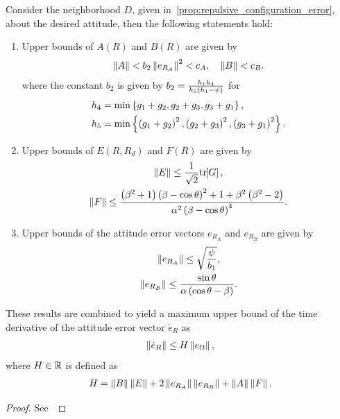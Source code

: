 \begin{prop}\label{prop:eR_dot_bound}
Consider the neighborhood \( D \), given in~\cref{prop:repulsive_configuration_error}, about the desired attitude, then the following statements hold:
\begin{enumerate}
    \item \label{item:prop_eR_dot_bound_AB} Upper bounds of \( A(R) \) and \( B(R) \) are given by
        \begin{gather}
            \left\| A \right\| < b_2 \left\| e_{R_A} \right\|^2 < c_A  , \quad \left\| B \right\| < c_B. \label{eqn:AB_bound}
        \end{gather}
        where the constant \( b_2\) is given by \( b_2 = \frac{h_1 h_4}{h_5 \left( h_1 - \psi \right)}\) for
        \begin{align*}
            h_4 &= \min\left\{ g_1 + g_2, g_2 + g_3 , g_3 + g_1 \right\} ,\\
            h_5 &= \min\left\{ \left( g_1 + g_2 \right)^2,\left( g_2 + g_3 \right)^2 , \left( g_3 + g_1 \right)^2 \right\}.
        \end{align*}
    \item \label{item:prop_eR_dot_bound_EF} Upper bounds of \( E(R,R_d) \) and \( F(R) \) are given by
        \begin{gather}
            \left\| E \right\| \leq \frac{1}{\sqrt{2}} \mathrm{tr}\negthickspace\left[ G \right]  , \label{eqn:E_bound} \\
            \left\| F \right\| \leq \frac{\left( \beta^2 + 1 \right)\left( \beta - \cos \theta \right)^2 + 1 + \beta^2 \left( \beta^2-2 \right)}{\alpha^2 \left( \beta-\cos \theta \right)^4}. \label{eqn:F_bound}
        \end{gather}
    \item Upper bounds of the attitude error vectors \( e_{R_A} \) and \( e_{R_B} \) are given by
        \begin{gather}
            \left\| e_{R_A} \right\| \leq \sqrt{\frac{\psi}{b_1}}, \label{eqn:eRA_bound} \\
            \left\| e_{R_B} \right\| \leq \frac{\sin\theta}{\alpha \left( \cos \theta - \beta \right)}. \label{eqn:eRB_bound}
        \end{gather}
\end{enumerate}
These results are combined to yield a maximum upper bound of the time derivative of the attitude error vector \( \dot{e}_R \) as
\begin{gather}
	\left\| \dot{e}_R \right\| \leq H \left\| e_\Omega \right\| ,\label{eqn:eR_bound}
\end{gather}
where  \( H \in \mathbb{R} \) is defined as
\begin{gather}
	H = \left\| B \right\| \left\| E \right\| + 2 \left\| e_{R_A} \right\| \left\| e_{R_B} \right\| + \left\| A \right\|\left\| F \right\|. \label{eqn:H}
\end{gather}
\end{prop}
\begin{proof}
See~
\end{proof}

